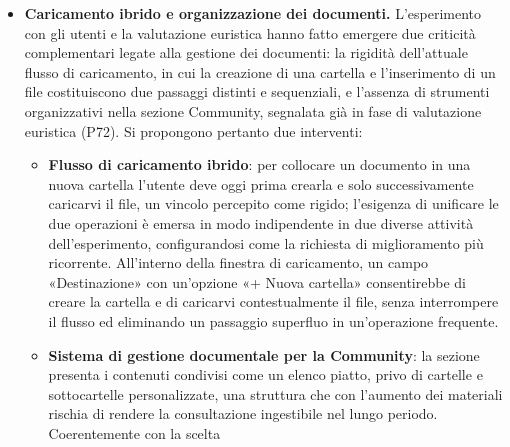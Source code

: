 \begin{itemize}
\begin{itemize}
    proprie note, riacquisendo il controllo su contenuti che oggi è costretto
    ad accettare così come sono.
    \item \textbf{Formattazione di base dei testi}: le descrizioni degli appunti
    e i commenti verrebbero arricchiti con strumenti di formattazione inline e
    scorciatoie da tastiera per grassetto, corsivo ed elenchi, permettendo di
    strutturare i contenuti più lunghi e di evidenziare i passaggi rilevanti, a
    beneficio della leggibilità complessiva.
  \end{itemize}
  Nel loro insieme questi interventi mirano a snellire i percorsi di interazione
  più ricorrenti e ad ampliare il controllo dell'utente sui contenuti, riducendo
  il numero di click necessari e il carico cognitivo legato all'uso
  dell'interfaccia.

  \item \textbf{Caricamento ibrido e organizzazione dei documenti.}
  L'esperimento con gli utenti e la valutazione euristica hanno fatto emergere
  due criticità complementari legate alla gestione dei documenti: la rigidità
  dell'attuale flusso di caricamento, in cui la creazione di una cartella e
  l'inserimento di un file costituiscono due passaggi distinti e sequenziali, e
  l'assenza di strumenti organizzativi nella sezione Community, segnalata già in
  fase di valutazione euristica (P72). Si propongono pertanto due interventi:
  \begin{itemize}
    \item \textbf{Flusso di caricamento ibrido}: per collocare un documento in
    una nuova cartella l'utente deve oggi prima crearla e solo successivamente
    caricarvi il file, un vincolo percepito come rigido; l'esigenza di unificare
    le due operazioni è emersa in modo indipendente in due diverse attività
    dell'esperimento, configurandosi come la richiesta di miglioramento più
    ricorrente. All'interno della finestra di caricamento, un campo
    «Destinazione» con un'opzione «+ Nuova cartella» consentirebbe di creare la
    cartella e di caricarvi contestualmente il file, senza interrompere il
    flusso ed eliminando un passaggio superfluo in un'operazione frequente.
    \item \textbf{Sistema di gestione documentale per la Community}: la sezione
    presenta i contenuti condivisi come un
    elenco piatto, privo di cartelle e sottocartelle personalizzate, una
    struttura che con l'aumento dei materiali rischia di rendere la
    consultazione ingestibile nel lungo periodo. Coerentemente con la scelta

\end{itemize}
\end{itemize}
